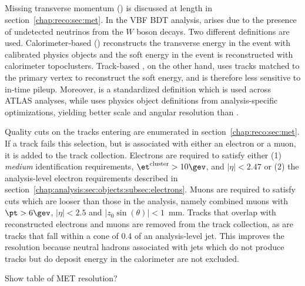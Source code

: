 \subsection{\etmiss}

Missing transverse momentum (\etmiss) is discussed at length in
section~\ref{chap:reco:sec:met}. In the VBF BDT analysis, \etmiss
arises due to the presence of undetected neutrinos from the $W$ boson
decays. Two different \etmiss definitions are used. Calorimeter-based
\etmiss (\calomet) reconstructs the transverse energy in the event
with calibrated physics objects and the soft energy in the event is
reconstructed with calorimeter topoclusters. Track-based \etmiss, on
the other hand, uses tracks matched to the primary vertex to
reconstruct the soft energy, and is therefore less sensitive to
in-time pileup. Moreover, \calomet is a standardized
definition which is used across ATLAS analyses, while \trkmet uses
physics object definitions from analysis-specific optimizations,
yielding better scale and angular resolution than \calomet. 

Quality cuts on the tracks entering \trkmet are enumerated in
section~\ref{chap:reco:sec:met}. If a track fails this selection, but
is associated with either an electron or a muon, it is added to the
track collection. Electrons are required to satisfy either (1) {\it
  medium} identification requirements, $\et^{\textrm{cluster}} > 10
\gev$, and $|\eta| < 2.47$ or (2) the analysis-level electron
requirements described in
section~\ref{chap:analysis:sec:objects:subsec:electrons}. Muons are
required to satisfy cuts which are looser than those in the analysis,
namely combined muons with $\pt > 6 \gev$, $|\eta| < 2.5$ and
$|z_0\sin (\theta)| < 1$~mm. Tracks that overlap with reconstructed
electrons and muons are removed from the track collection, as are tracks
that fall within a cone of 0.4 of an analysis-level jet. This improves
the resolution because neutral hadrons associated with jets which do
not produce tracks but do deposit energy in the calorimeter are not
excluded. 

\noindent Show table of MET resolution?


